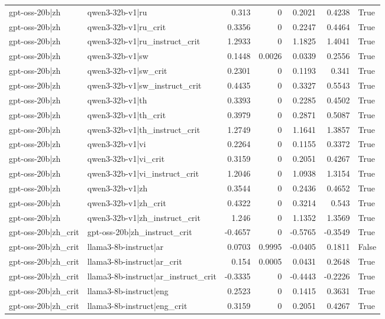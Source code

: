 \begin{table}
\begin{tabular}{l l r r r r l}
gpt-oss-20b|zh & qwen3-32b-v1|ru & 0.313 & 0 & 0.2021 & 0.4238 & True \\
gpt-oss-20b|zh & qwen3-32b-v1|ru_crit & 0.3356 & 0 & 0.2247 & 0.4464 & True \\
gpt-oss-20b|zh & qwen3-32b-v1|ru_instruct_crit & 1.2933 & 0 & 1.1825 & 1.4041 & True \\
gpt-oss-20b|zh & qwen3-32b-v1|sw & 0.1448 & 0.0026 & 0.0339 & 0.2556 & True \\
gpt-oss-20b|zh & qwen3-32b-v1|sw_crit & 0.2301 & 0 & 0.1193 & 0.341 & True \\
gpt-oss-20b|zh & qwen3-32b-v1|sw_instruct_crit & 0.4435 & 0 & 0.3327 & 0.5543 & True \\
gpt-oss-20b|zh & qwen3-32b-v1|th & 0.3393 & 0 & 0.2285 & 0.4502 & True \\
gpt-oss-20b|zh & qwen3-32b-v1|th_crit & 0.3979 & 0 & 0.2871 & 0.5087 & True \\
gpt-oss-20b|zh & qwen3-32b-v1|th_instruct_crit & 1.2749 & 0 & 1.1641 & 1.3857 & True \\
gpt-oss-20b|zh & qwen3-32b-v1|vi & 0.2264 & 0 & 0.1155 & 0.3372 & True \\
gpt-oss-20b|zh & qwen3-32b-v1|vi_crit & 0.3159 & 0 & 0.2051 & 0.4267 & True \\
gpt-oss-20b|zh & qwen3-32b-v1|vi_instruct_crit & 1.2046 & 0 & 1.0938 & 1.3154 & True \\
gpt-oss-20b|zh & qwen3-32b-v1|zh & 0.3544 & 0 & 0.2436 & 0.4652 & True \\
gpt-oss-20b|zh & qwen3-32b-v1|zh_crit & 0.4322 & 0 & 0.3214 & 0.543 & True \\
gpt-oss-20b|zh & qwen3-32b-v1|zh_instruct_crit & 1.246 & 0 & 1.1352 & 1.3569 & True \\
gpt-oss-20b|zh_crit & gpt-oss-20b|zh_instruct_crit & -0.4657 & 0 & -0.5765 & -0.3549 & True \\
gpt-oss-20b|zh_crit & llama3-8b-instruct|ar & 0.0703 & 0.9995 & -0.0405 & 0.1811 & False \\
gpt-oss-20b|zh_crit & llama3-8b-instruct|ar_crit & 0.154 & 0.0005 & 0.0431 & 0.2648 & True \\
gpt-oss-20b|zh_crit & llama3-8b-instruct|ar_instruct_crit & -0.3335 & 0 & -0.4443 & -0.2226 & True \\
gpt-oss-20b|zh_crit & llama3-8b-instruct|eng & 0.2523 & 0 & 0.1415 & 0.3631 & True \\
gpt-oss-20b|zh_crit & llama3-8b-instruct|eng_crit & 0.3159 & 0 & 0.2051 & 0.4267 & True \\

\end{tabular}
\end{table}
